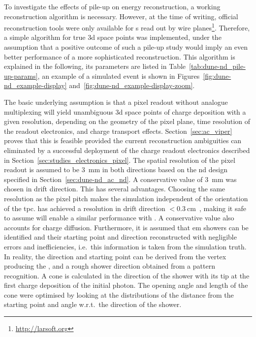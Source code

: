 To investigate the effects of pile-up on energy reconstruction, a working reconstruction algorithm is necessary.
However, at the time of writing, official reconstruction tools were only available for \lartpc{}s read out by wire planes\footnote{\url{http://larsoft.org}}.
Therefore, a simple algorithm for true \gls{3d} space points was implemented, under the assumption that a positive outcome of such a pile-up study would imply an even better performance of a more sophisticated reconstruction.
This algorithm is explained in the following, its parameters are listed in Table~\ref{tab:dune-nd_pile-up-params}, an example of a simulated event is shown in Figures~\ref{fig:dune-nd_example-display} and~\ref{fig:dune-nd_example-display-zoom}.

The basic underlying assumption is that a pixel readout without analogue multiplexing will yield unambiguous \gls{3d} space points of charge deposition with a given resolution, depending on the geometry of the pixel plane, time resolution of the readout electronics, and charge transport effects.
Section~\ref{sec:ac_viper} proves that this is feasible provided the current reconstruction ambiguities can eliminated by a successful deployment of the \larpix{} charge readout electronics described in Section~\ref{sec:studies_electronics_pixel}.
The spatial resolution of the pixel readout is assumed to be \SI{3}{\milli\metre} in both directions based on the \gls{nd} design specified in Section~\ref{sec:dune-nd_ac_nd}.
A conservative value of \SI{3}{\milli\meter} was chosen in drift direction.
This has several advantages.
Choosing the same resolution as the pixel pitch makes the simulation independent of the orientation of the \gls{tpc}.
\uboone{} has achieved a resolution in drift direction $< \SI{0.3}{\centi\metre}$~\cite{uboone}, making it safe to assume \larpix{} will enable a similar performance with \AC{}.
A conservative value also accounts for charge diffusion.
Furthermore, it is assumed that \gls{em} showers can be identified and their starting point and direction reconstructed with negligible errors and inefficiencies, i.e.\ this information is taken from the simulation truth.
In reality, the direction and starting point can be derived from the vertex producing the \Pgpz, and a rough shower direction obtained from a pattern recognition.
A cone is calculated in the direction of the shower with its tip at the first charge deposition of the initial photon.
The opening angle and length of the cone were optimised by looking at the distributions of the distance from the starting point and angle w.r.t.\ the direction of the shower.
